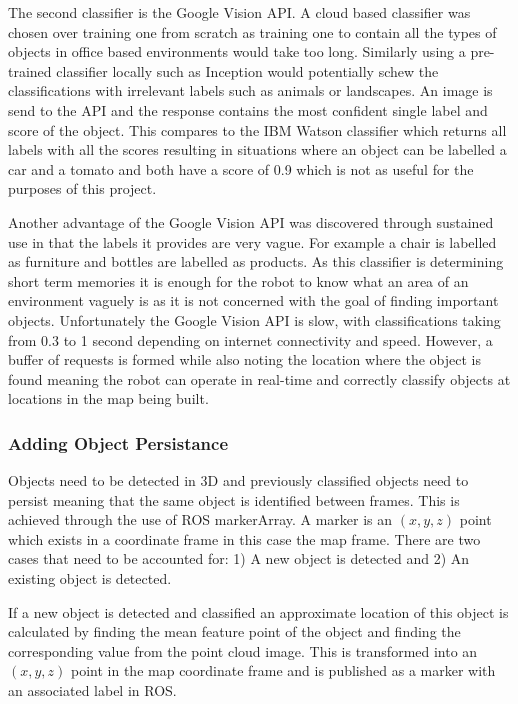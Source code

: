\documentclass{mproj}
\begin{document}
The second classifier is the Google Vision API. A cloud based classifier was chosen over training one from scratch as training one to contain all the types of objects in office based environments would take too long. Similarly using a pre-trained classifier locally such as Inception \cite{inception} would potentially schew the classifications with irrelevant labels such as animals or landscapes. An image is send to the API and the response contains the most confident single label and score of the object. This compares to the IBM Watson classifier \cite{ibm} which returns all labels with all the scores resulting in situations where an object can be labelled a car and a tomato and both have a score of 0.9 which is not as useful for the purposes of this project. 

Another advantage of the Google Vision API was discovered through sustained use in that the labels it provides are very vague. For example a chair is labelled as furniture and bottles are labelled as products. As this classifier is determining short term memories it is enough for the robot to know what an area of an environment vaguely is as it is not concerned with the goal of finding important objects. Unfortunately the Google Vision API is slow, with classifications taking from 0.3 to 1 second depending on internet connectivity and speed. However, a buffer of requests is formed while also noting the location where the object is found meaning the robot can operate in real-time and correctly classify objects at locations in the map being built.



\subsubsection{Adding Object Persistance}

Objects need to be detected in 3D and previously classified objects need to persist meaning that the same object is identified between frames. This is achieved through the use of ROS markerArray. A marker is an $(x, y, z)$ point which exists in a coordinate frame in this case the map frame. There are two cases that need to be accounted for: 1) A new object is detected and 2) An existing object is detected.


If a new object is detected and classified an approximate location of this object is calculated by finding the mean feature point of the object and finding the corresponding value from the point cloud image. This is transformed into an $(x, y, z)$ point in the map coordinate frame and is published as a marker with an associated label in ROS. 
\end{document}
